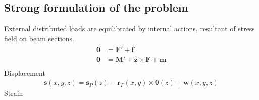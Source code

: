 \documentclass[letterpaper,10pt,english]{jupyterBook}
\begin{document}
\subsection{Strong formulation of the problem}
\label{\detokenize{ch/solids/small-displacements-statics-beams-weak-form-general:strong-formulation-of-the-problem}}\label{\detokenize{ch/solids/small-displacements-statics-beams-weak-form-general:solid-mechanics-intro-small-displacements-statics-beam-weak-form-strong}}
\sphinxAtStartPar
{} External distributed loads are equilibrated by internal actions, resultant of stress field on beam sections.
\begin{equation*}
\begin{split}\begin{aligned}
  \mathbf{0} & = \mathbf{F}' + \mathbf{f} \\
  \mathbf{0} & = \mathbf{M}' + \hat{\mathbf{z}} \times \mathbf{F} + \mathbf{m} \\
\end{aligned}\end{split}
\end{equation*}
\sphinxAtStartPar
{} Displacement
\begin{equation*}
\begin{split}\mathbf{s}(x,y,z) = \mathbf{s}_P(z) - \mathbf{r}_P(x,y) \times \boldsymbol\theta(z) + \mathbf{w}(x,y,z)\end{split}
\end{equation*}
\sphinxAtStartPar
Strain
\end{document}
